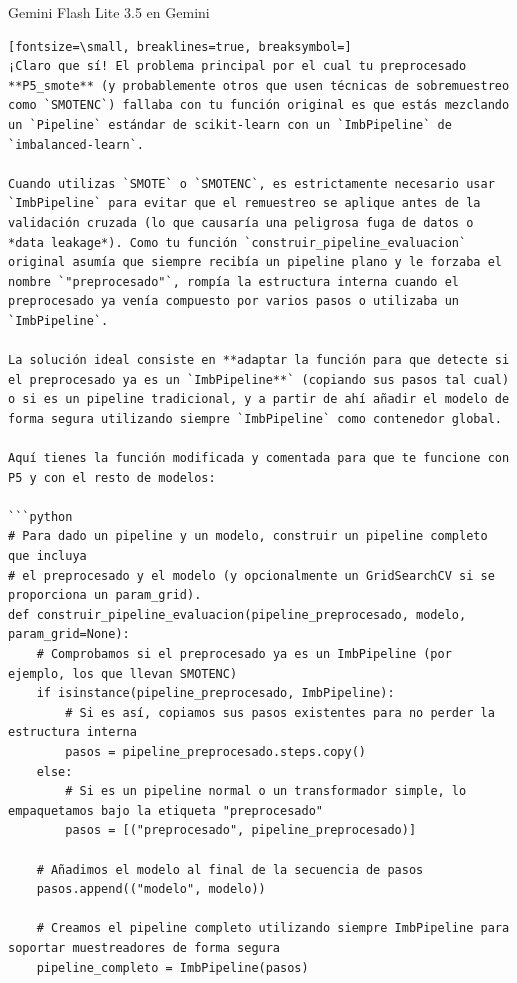 \documentclass[12pt,a4paper,oneside]{book}
\begin{document}
\begin{iaresp}{Gemini Flash Lite 3.5 en Gemini}
\begin{Verbatim}[fontsize=\small, breaklines=true, breaksymbol=]
¡Claro que sí! El problema principal por el cual tu preprocesado **P5_smote** (y probablemente otros que usen técnicas de sobremuestreo como `SMOTENC`) fallaba con tu función original es que estás mezclando un `Pipeline` estándar de scikit-learn con un `ImbPipeline` de `imbalanced-learn`.

Cuando utilizas `SMOTE` o `SMOTENC`, es estrictamente necesario usar `ImbPipeline` para evitar que el remuestreo se aplique antes de la validación cruzada (lo que causaría una peligrosa fuga de datos o *data leakage*). Como tu función `construir_pipeline_evaluacion` original asumía que siempre recibía un pipeline plano y le forzaba el nombre `"preprocesado"`, rompía la estructura interna cuando el preprocesado ya venía compuesto por varios pasos o utilizaba un `ImbPipeline`.

La solución ideal consiste en **adaptar la función para que detecte si el preprocesado ya es un `ImbPipeline**` (copiando sus pasos tal cual) o si es un pipeline tradicional, y a partir de ahí añadir el modelo de forma segura utilizando siempre `ImbPipeline` como contenedor global.

Aquí tienes la función modificada y comentada para que te funcione con P5 y con el resto de modelos:

```python
# Para dado un pipeline y un modelo, construir un pipeline completo que incluya 
# el preprocesado y el modelo (y opcionalmente un GridSearchCV si se proporciona un param_grid).
def construir_pipeline_evaluacion(pipeline_preprocesado, modelo, param_grid=None):
    # Comprobamos si el preprocesado ya es un ImbPipeline (por ejemplo, los que llevan SMOTENC)
    if isinstance(pipeline_preprocesado, ImbPipeline):
        # Si es así, copiamos sus pasos existentes para no perder la estructura interna
        pasos = pipeline_preprocesado.steps.copy()
    else:
        # Si es un pipeline normal o un transformador simple, lo empaquetamos bajo la etiqueta "preprocesado"
        pasos = [("preprocesado", pipeline_preprocesado)]
    
    # Añadimos el modelo al final de la secuencia de pasos
    pasos.append(("modelo", modelo))
    
    # Creamos el pipeline completo utilizando siempre ImbPipeline para soportar muestreadores de forma segura
    pipeline_completo = ImbPipeline(pasos)
    

\end{Verbatim}
\end{iaresp}
\end{document}
